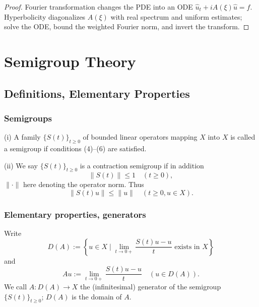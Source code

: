 \begin{proof}
\sketch Fourier transformation changes the PDE into an ODE $\hat u_t+iA(\xi)\hat u=\hat f$. Hyperbolicity diagonalizes $A(\xi)$ with real spectrum and uniform estimates; solve the ODE, bound the weighted Fourier norm, and invert the transform.
\end{proof}

\section{Semigroup Theory}
\label{sec:semigroup-theory}

\subsection{Definitions, Elementary Properties}

\subsubsection{Semigroups}

\begin{definition}
\label{def:semigroup-contraction-semigroup}
(i) A family $\{S(t)\}_{t \geq 0}$ of bounded linear operators mapping $X$ into $X$ is called a semigroup if conditions (4)--(6) are satisfied.

(ii) We say $\{S(t)\}_{t \geq 0}$ is a contraction semigroup if in addition
\[
\|S(t)\| \leq 1 \quad (t \geq 0),
\tag{7}
\]
$\|\cdot\|$ here denoting the operator norm. Thus
\[
\|S(t)u\| \leq \|u\| \quad (t \geq 0, u \in X).
\]
\end{definition}

\subsubsection{Elementary properties, generators}

\begin{definition}
\label{def:semigroup-generator}
Write
\[
D(A) := \left\{u \in X \mid \lim_{t \to 0+} \frac{S(t)u - u}{t} \text{ exists in } X\right\}
\tag{8}
\]
and
\[
Au := \lim_{t \to 0+} \frac{S(t)u - u}{t} \quad (u \in D(A)).
\tag{9}
\]
We call $A : D(A) \to X$ the (infinitesimal) generator of the semigroup $\{S(t)\}_{t \geq 0}$; $D(A)$ is the domain of $A$.
\end{definition}

